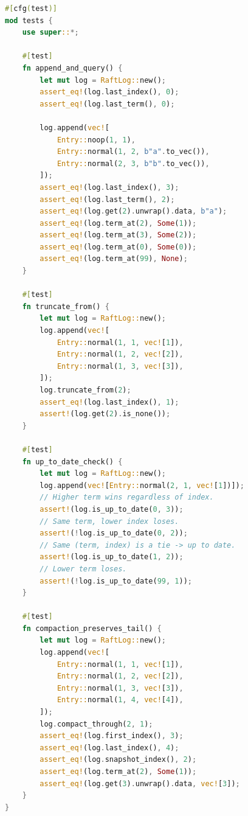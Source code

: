 \documentclass[12pt,a4paper]{report}
\begin{document}
\begin{lstlisting}[language=Rust]
#[cfg(test)]
mod tests {
    use super::*;

    #[test]
    fn append_and_query() {
        let mut log = RaftLog::new();
        assert_eq!(log.last_index(), 0);
        assert_eq!(log.last_term(), 0);

        log.append(vec![
            Entry::noop(1, 1),
            Entry::normal(1, 2, b"a".to_vec()),
            Entry::normal(2, 3, b"b".to_vec()),
        ]);
        assert_eq!(log.last_index(), 3);
        assert_eq!(log.last_term(), 2);
        assert_eq!(log.get(2).unwrap().data, b"a");
        assert_eq!(log.term_at(2), Some(1));
        assert_eq!(log.term_at(3), Some(2));
        assert_eq!(log.term_at(0), Some(0));
        assert_eq!(log.term_at(99), None);
    }

    #[test]
    fn truncate_from() {
        let mut log = RaftLog::new();
        log.append(vec![
            Entry::normal(1, 1, vec![1]),
            Entry::normal(1, 2, vec![2]),
            Entry::normal(1, 3, vec![3]),
        ]);
        log.truncate_from(2);
        assert_eq!(log.last_index(), 1);
        assert!(log.get(2).is_none());
    }

    #[test]
    fn up_to_date_check() {
        let mut log = RaftLog::new();
        log.append(vec![Entry::normal(2, 1, vec![1])]);
        // Higher term wins regardless of index.
        assert!(log.is_up_to_date(0, 3));
        // Same term, lower index loses.
        assert!(!log.is_up_to_date(0, 2));
        // Same (term, index) is a tie -> up to date.
        assert!(log.is_up_to_date(1, 2));
        // Lower term loses.
        assert!(!log.is_up_to_date(99, 1));
    }

    #[test]
    fn compaction_preserves_tail() {
        let mut log = RaftLog::new();
        log.append(vec![
            Entry::normal(1, 1, vec![1]),
            Entry::normal(1, 2, vec![2]),
            Entry::normal(1, 3, vec![3]),
            Entry::normal(1, 4, vec![4]),
        ]);
        log.compact_through(2, 1);
        assert_eq!(log.first_index(), 3);
        assert_eq!(log.last_index(), 4);
        assert_eq!(log.snapshot_index(), 2);
        assert_eq!(log.term_at(2), Some(1));
        assert_eq!(log.get(3).unwrap().data, vec![3]);
    }
}
\end{lstlisting}
\end{document}
